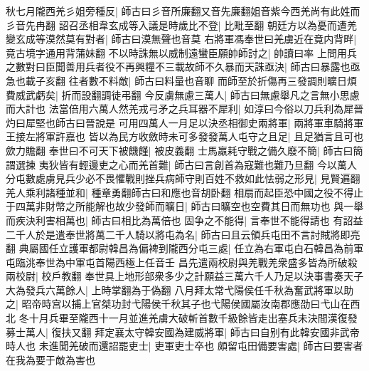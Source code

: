 秋七月隴西羌彡姐旁種反|{
	師古曰彡音所廉翻又音先廉翻姐音紫今西羌尚有此姓而彡音先冉翻}
詔召丞相韋玄成等入議是時歲比不登|{
	比毗至翻}
朝廷方以為憂而遭羌變玄成等漠然莫有對者|{
	師古曰漠無聲也音莫}
右將軍馮奉世曰羌虜近在竟内背畔|{
	竟古境字通用背蒲妹翻}
不以時誅無以威制遠蠻臣願帥師討之|{
	帥讀曰率}
上問用兵之數對曰臣聞善用兵者役不再興糧不三載故師不久暴而天誅亟決|{
	師古曰暴露也亟急也載子亥翻}
往者數不料敵|{
	師古曰料量也音聊}
而師至於折傷再三發調則曠日煩費威武虧矣|{
	折而設翻調徒弔翻}
今反虜無慮三萬人|{
	師古曰無慮舉凡之言無小思慮而大計也}
法當倍用六萬人然羌戎弓矛之兵耳器不犀利|{
	如淳曰今俗以刀兵利為犀晉灼曰犀堅也師古曰晉說是}
可用四萬人一月足以決丞相御史兩將軍|{
	兩將軍車騎將軍王接左將軍許嘉也}
皆以為民方收斂時未可多發發萬人屯守之且足|{
	且足猶言且可也歛力贍翻}
奉世曰不可天下被饑饉|{
	被皮義翻}
士馬羸耗守戰之備久廢不簡|{
	師古曰簡謂選揀}
夷狄皆有輕邊吏之心而羌首難|{
	師古曰言創首為寇難也難乃旦翻}
今以萬人分屯數處虜見兵少必不畏懼戰則挫兵病師守則百姓不救如此怯弱之形見|{
	見賢遍翻}
羌人乘利諸種並和|{
	種章勇翻師古曰和應也音胡卧翻}
相扇而起臣恐中國之役不得止于四萬非財幣之所能解也故少發師而曠日|{
	師古曰曠空也空費其日而無功也}
與一舉而疾決利害相萬也|{
	師古曰相比為萬倍也}
固争之不能得|{
	言奉世不能得請也}
有詔益二千人於是遣奉世將萬二千人騎以將屯為名|{
	師古曰且云領兵屯田不言討賊將即亮翻}
典屬國任立護軍都尉韓昌為偏裨到隴西分屯三處|{
	任立為右軍屯白石韓昌為前軍屯臨洮奉世為中軍屯首陽西極上任音壬}
昌先遣兩校尉與羌戰羌衆盛多皆為所破殺兩校尉|{
	校戶教翻}
奉世具上地形部衆多少之計願益三萬六千人乃足以決事書奏天子大為發兵六萬餘人|{
	上時掌翻為于偽翻}
八月拜太常弋陽侯任千秋為奮武將軍以助之|{
	昭帝時宫以捕上官桀功封弋陽侯千秋其子也弋陽侯國屬汝南郡應劭曰弋山在西北}
冬十月兵畢至隴西十一月並進羌虜大破斬首數千級餘皆走出塞兵未決間漢復發募士萬人|{
	復扶又翻}
拜定襄太守韓安國為建威將軍|{
	師古曰自别有此韓安國非武帝時人也}
未進聞羌破而還詔罷吏士|{
	吏軍吏士卒也}
頗留屯田備要害處|{
	師古曰要害者在我為要于敵為害也}


